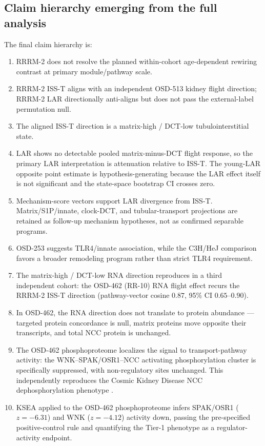 \documentclass[11pt]{article}
\begin{document}
\subsection{Claim hierarchy emerging from the full analysis}

The final claim hierarchy is:
\begin{enumerate}
  \item RRRM-2 does not resolve the planned within-cohort age-dependent rewiring contrast at primary module/pathway scale.
  \item RRRM-2 ISS-T aligns with an independent OSD-513 kidney flight direction; RRRM-2 LAR directionally anti-aligns but does not pass the external-label permutation null.
  \item The aligned ISS-T direction is a matrix-high / DCT-low tubulointerstitial state.
  \item LAR shows no detectable pooled matrix-minus-DCT flight response, so the primary LAR interpretation is attenuation relative to ISS-T. The young-LAR opposite point estimate is hypothesis-generating because the LAR effect itself is not significant and the state-space bootstrap CI crosses zero.
  \item Mechanism-score vectors support LAR divergence from ISS-T. Matrix/S1P/innate, clock-DCT, and tubular-transport projections are retained as follow-up mechanism hypotheses, not as confirmed separable programs.
  \item OSD-253 suggests TLR4/innate association, while the C3H/HeJ comparison favors a broader remodeling program rather than strict TLR4 requirement.
  \item The matrix-high / DCT-low RNA direction reproduces in a third independent cohort: the OSD-462 (RR-10) RNA flight effect recurs the RRRM-2 ISS-T direction (pathway-vector cosine $0.87$, 95\% CI $0.65$--$0.90$).
  \item In OSD-462, the RNA direction does not translate to protein abundance --- targeted protein concordance is null, matrix proteins move opposite their transcripts, and total NCC protein is unchanged.
  \item The OSD-462 phosphoproteome localizes the signal to transport-pathway activity: the WNK--SPAK/OSR1--NCC activating phosphorylation cluster is specifically suppressed, with non-regulatory sites unchanged. This independently reproduces the Cosmic Kidney Disease NCC dephosphorylation phenotype \citep{siew2024cosmic}.
  \item KSEA applied to the OSD-462 phosphoproteome infers SPAK/OSR1 ($z=-6.31$) and WNK ($z=-4.12$) activity down, passing the pre-specified positive-control rule and quantifying the Tier-1 phenotype as a regulator-activity endpoint.

\end{enumerate}
\end{document}

